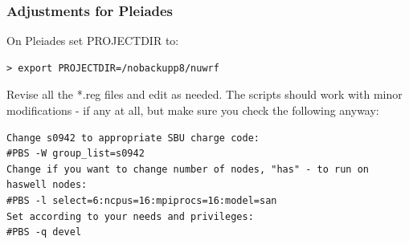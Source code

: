 \begin{frame}[fragile]
\frametitle{Adjustments for Pleiades}

On Pleiades set  PROJECTDIR to:
\verbatimfont{\small}%
\begin{verbatim}
> export PROJECTDIR=/nobackupp8/nuwrf
\end{verbatim}
Revise all the *.reg files and edit as needed. The scripts should work with minor modifications - if any at all, but make sure you check the following anyway:
\verbatimfont{\scriptsize}%
\begin{verbatim}
Change s0942 to appropriate SBU charge code:
#PBS -W group_list=s0942 
Change if you want to change number of nodes, "has" - to run on haswell nodes:
#PBS -l select=6:ncpus=16:mpiprocs=16:model=san
Set according to your needs and privileges:
#PBS -q devel 
\end{verbatim}
\end{frame}

